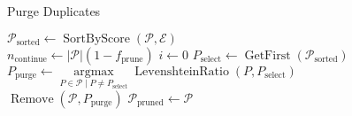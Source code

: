 \begin{algorithm}
    \caption{Purge Duplicates}
    \label{alg:duplicpurge}
    $\mathcal{P}_{\text{sorted}} \gets \operatorname{SortByScore}(\mathcal{P}, \mathcal{E})$ \\
    $n_{\text{continue}} \gets \vert\mathcal{P}\vert(1-f_{\text{prune}})$
    $i \gets 0$
     {
        $P_{\text{select}} \gets \operatorname{GetFirst}(\mathcal{P}_{\text{sorted}})$ \\ 
        $P_{\text{purge}} \gets \underset{P\in\mathcal{P}\mid P \neq P_{\text{select}}}{\operatorname{argmax}} \operatorname{LevenshteinRatio}(P, P_{\text{select}})$ \\
        $\operatorname{Remove}(\mathcal{P}, P_{\text{purge}})$
    }
    $\mathcal{P}_{\text{pruned}} \gets \mathcal{P}$\\
\end{algorithm}
